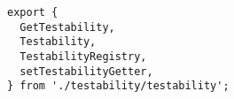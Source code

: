 \begin{verbatim}
export {
  GetTestability,
  Testability,
  TestabilityRegistry,
  setTestabilityGetter,
} from './testability/testability';
\end{verbatim}
